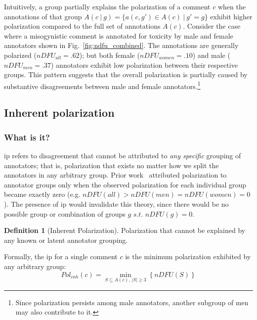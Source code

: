 \documentclass{article} %
\theoremstyle{definition}
\newtheorem{definition}{Definition}
\theoremstyle{plain}
\newcommand\given[1][]{\:#1\vert\:}
\begin{document}
Intuitively, a group partially explains the polarization of a comment $c$ when the annotations of that group $A(c \given g) = \{a(c, g') \in A(c) \given g'=g\}$ exhibit higher polarization compared to the full set of annotations $A(c)$. Consider the case where a misogynistic comment is annotated for toxicity by male and female annotators shown in Fig.~\ref{fig:ndfu_combined}. The annotations are generally polarized ($nDFU_{all}=.62$); but both female ($nDFU_{women}=.10$) and male ($nDFU_{men}=.37$) annotators exhibit low polarization between their respective groups. This pattern suggests that the overall polarization is partially caused by substantive disagreements between male and female annotators.\footnote{\label{foot:iterative}Since polarization persists among male annotators, another subgroup of men may also contribute to it.}


\subsection{Inherent polarization}
\label{sec:inherent:inherent}

\subsubsection{What is it?}

\acf{ip} refers to disagreement that cannot be attributed to \emph{any specific} grouping of annotators; that is, polarization that exists no matter how we split the annotators in any arbitrary group. Prior work~\cite{pavlopoulos-likas-2024} attributed polarization to annotator groups only when the observed polarization for each individual group became exactly zero (e.g. $nDFU(all) > nDFU(men)=nDFU(women) = 0$). The presence of \ac{ip} would invalidate this theory, since there would be no possible group or combination of groups $g \textit{ s.t. } nDFU(g) = 0$.

\begin{definition}[Inherent Polarization]
	\label{def:inherent}
	Polarization that cannot be explained by any known or latent annotator grouping.
\end{definition}


Formally, the \ac{ip} for a single comment $c$ is the minimum polarization exhibited by any arbitrary group:
\begin{equation}
	\label{eq:inherent}
	Pol_{inh}(c) =
	\min_{S \subseteq A(c),\, |S| \ge 3}
	\left\{
	\textit{nDFU}(S)
	\right\}
\end{equation}
\end{document}
